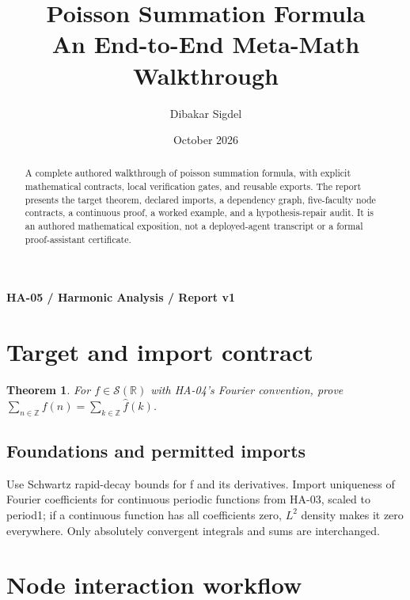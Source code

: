 \documentclass[preprint,12pt,aps,pra,showkeys,amsmath,amssymb,superscriptaddress,floatfix]{revtex4-2}
\newtheorem{theorem}{Theorem}[section]
\theoremstyle{definition}
\theoremstyle{remark}
\begin{document}
\title{Poisson Summation Formula\\[4pt]\large An End-to-End Meta-Math Walkthrough}

\author{Dibakar Sigdel}


\date{October 2026}

\begin{abstract}

A complete authored walkthrough of poisson summation formula, with
explicit mathematical contracts, local verification gates, and reusable
exports. The report presents the target theorem, declared imports, a
dependency graph, five-faculty node contracts, a continuous proof, a
worked example, and a hypothesis-repair audit. It is an authored
mathematical exposition, not a deployed-agent transcript or a formal
proof-assistant certificate.

\end{abstract}\maketitle\linespread{1.12}\selectfont

\noindent\textbf{HA-05 / Harmonic Analysis / Report v1}

\section{Target and import contract}

\begin{theorem}

For \(f\in\mathcal S(\mathbb R)\) with HA-04's Fourier convention, prove
\(\sum_{n\in\mathbb Z}f(n)=\sum_{k\in\mathbb Z}\widehat f(k)\).

\end{theorem}

\subsection{Foundations and permitted imports}

Use Schwartz rapid-decay bounds for f and its derivatives. Import
uniqueness of Fourier coefficients for continuous periodic functions
from HA-03, scaled to period1; if a continuous function has all
coefficients zero, \(L^{2}\) density makes it zero everywhere. Only
absolutely convergent integrals and sums are interchanged.

\clearpage\section{Node interaction workflow}
\end{document}
